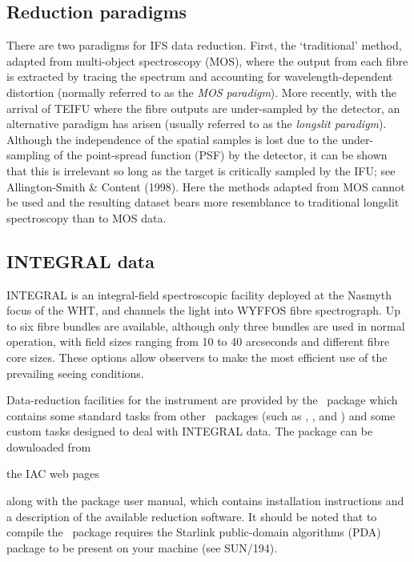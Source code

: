 \documentclass[twoside,11pt]{article}
\newcommand{\htmladdnormallink}[2]{#1}
\newcommand{\xref}[3]{#1}
\newcommand{\xlabel}[1]{}
\begin{document}
\subsection{\xlabel{sc16_paradigms}Reduction paradigms\label{sc16_paradigms}}

There are two paradigms for IFS data reduction.  First, the
`traditional' method, adapted from multi-object spectroscopy (MOS),
where the output from each fibre is extracted by tracing the spectrum
and accounting for wavelength-dependent distortion (normally referred
to as the {\em MOS paradigm}).  More recently, with the arrival of
TEIFU where the fibre outputs are under-sampled by the detector, an
alternative paradigm has arisen (usually referred to as the {\em
longslit paradigm}).  Although the independence of the spatial samples
is lost due to the under-sampling of the point-spread function (PSF)
by the detector, it can be shown that this is irrelevant so long as
the target is critically sampled by the IFU; see Allington-Smith \&
Content (1998).  Here the methods adapted from MOS cannot be used and
the resulting dataset bears more resemblance to traditional longslit
spectroscopy than to MOS data.

\subsection{\xlabel{sc16_integral}INTEGRAL data\label{sc16_integral}}

\htmladdnormallink{INTEGRAL}{http://www.iac.es/proyect/integral/}
is an integral-field spectroscopic facility deployed at the Nasmyth
focus of the WHT, and channels the light into WYFFOS fibre
spectrograph.  Up to six fibre bundles are available, although only
three bundles are used in normal operation, with field sizes ranging
from 10 to 40 arcseconds and different fibre core sizes.  These
options allow observers to make the most efficient use of the
prevailing seeing conditions.

Data-reduction facilities for the instrument are provided by the
\INTEGRAL\ \IRAFref\normalsize package which contains some standard tasks from
other \IRAF\ packages (such as \ONEDSPEC, \SPECRED, and \CCDRED) and
some custom tasks designed to deal with INTEGRAL data.  The package
can be 
\htmladdnormallink{downloaded}{http://andromeda.roque.ing.iac.es/~astrosw/InstSoft/integral/integral-0.3.tar.gz}
from \goodbreak{}
\begin{htmlonly}
the IAC web pages
\end{htmlonly} 
along with the package \htmladdnormallink{user
manual}{http://andromeda.roque.ing.iac.es/~astrosw/InstSoft/integral/manual_de_reducciones.ps.gz},
which contains installation instructions and a description of the
available reduction software.  It should be noted that to compile
the \INTEGRAL\ package requires the Starlink public-domain algorithms
(PDA) package to be present on your machine (see
\xref{SUN/194}{sun194}{}).
\end{document}

